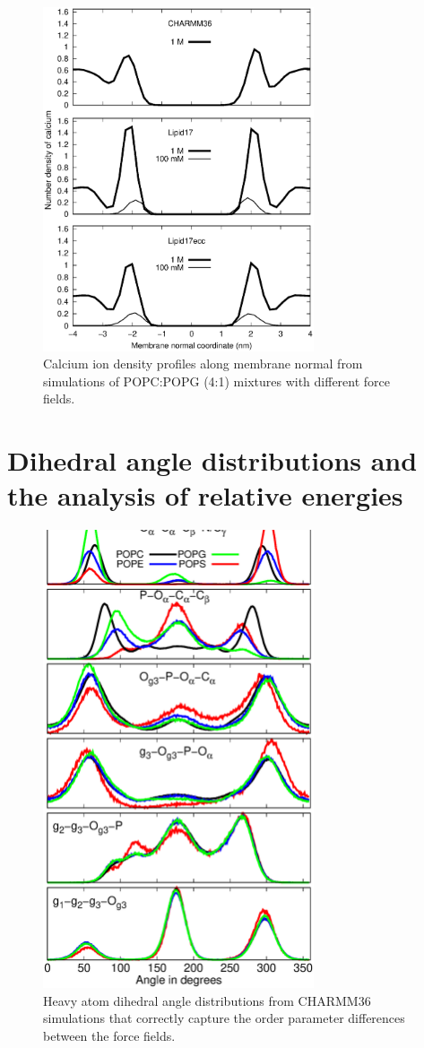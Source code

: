 \documentclass[journal=jpcbfk]{achemso}
\begin{document}
\begin{figure}[]
  \centering
  \includegraphics[width=8.0cm]{./Figs/CAdensPG1PC4.eps}
  \caption{\label{CAdensPG1PC4}
    Calcium ion density profiles along membrane normal from simulations of POPC:POPG (4:1) mixtures with different force fields.
  }
\end{figure}

\clearpage
\section{Dihedral angle distributions and the analysis of relative energies}
  

\begin{figure}[]
  \centering
  \includegraphics[width=8.0cm]{./Figs/DIHEDRALS.eps}
  \caption{\label{DIHdists}
    Heavy atom dihedral angle distributions from CHARMM36 simulations that correctly capture the
    order parameter differences between the force fields.
  }
\end{figure}
\end{document}
